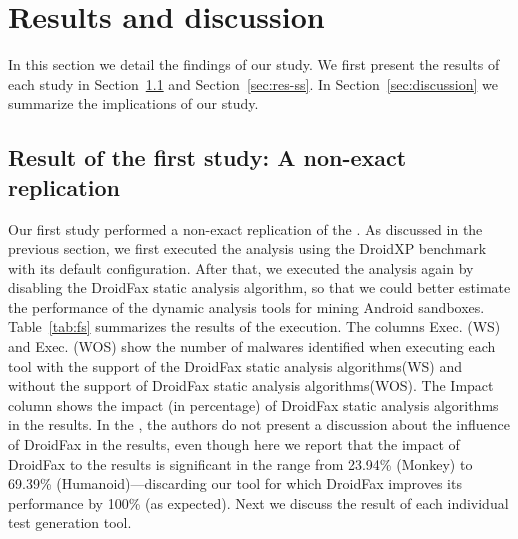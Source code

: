 \section{Results and discussion}

In this section we detail the findings of our study. We first present the results of each study
in Section~\ref{sec:res-fs} and Section~\ref{sec:res-ss}. In Section~\ref{sec:discussion} we summarize the
implications of our study. 

\subsection{Result of the first study: A non-exact replication}\label{sec:res-fs}

Our first study performed a non-exact replication of the \blls.
As discussed in the previous section, we first executed the analysis using the DroidXP benchmark with its default configuration. After that, we executed the analysis again by disabling the DroidFax static analysis algorithm, so that we could better estimate the performance of the dynamic analysis tools for mining Android sandboxes. Table~\ref{tab:fs} summarizes the results of the execution. The columns Exec. (WS) and Exec. (WOS) 
show the number of malwares identified when executing each tool with the
support of the DroidFax static analysis algorithms(WS) and without the support
of DroidFax static analysis algorithms(WOS). 
The Impact column shows the impact
(in percentage) of DroidFax static analysis algorithms in the results.
In the \blls, the authors do not present a
discussion about the influence of DroidFax in the results, even
though here we report that the impact of DroidFax to the results is significant in the
range from 23.94\% (Monkey) to 69.39\% (Humanoid)---discarding our
\joke tool for which DroidFax improves its performance by 100\% (as expected).
Next we discuss the result of each individual test generation tool. 

